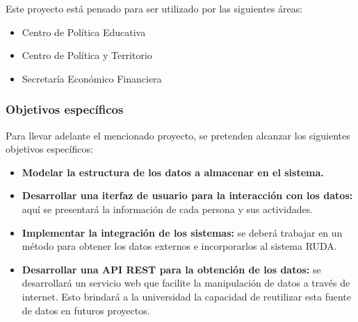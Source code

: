 Este proyecto está pensado para ser utilizado por las siguientes áreas:
\begin{itemize}
    \item Centro de Política Educativa
    \item Centro de Política y Territorio
    \item Secretaría Económico Financiera
\end{itemize}


\subsubsection{Objetivos específicos}%
\label{ssub:objetivos_especificos}

Para llevar adelante el mencionado proyecto, se pretenden alcanzar los siguientes objetivos específicos:

\begin{itemize}
    \item \textbf{Modelar la estructura de los datos a almacenar en el sistema.}
    \item \textbf{Desarrollar una iterfaz de usuario para la interacción con los datos:} aquí se presentará la información de cada persona y sus actividades.
    \item \textbf{Implementar la integración de los sistemas:} se deberá trabajar en un método para obtener los datos externos e incorporarlos al sistema RUDA.
    \item \textbf{Desarrollar una API REST para la obtención de los datos:} se desarrollará un servicio web que facilite la
        manipulación de datos a través de internet. Esto brindará a la universidad la capacidad de reutilizar esta fuente de datos en futuros proyectos.
\end{itemize}
